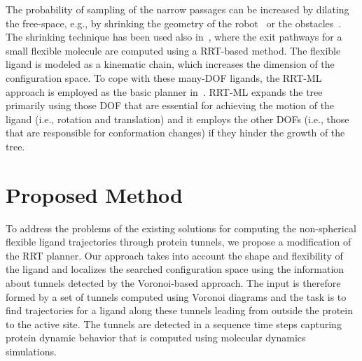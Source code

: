 \documentclass[usletter, 10pt, conference]{ieeeconf} %
\begin{document}
The probability of sampling of the narrow passages can be increased by dilating the free-space, e.g., by shrinking the geometry of 
the robot~\cite{hsuOnProb} or the obstacles~\cite{bayazitIRC}.
The shrinking technique has been used also in~\cite{cortes2010simulating}, where the exit pathways for a small flexible molecule are
computed using a RRT-based method.
The flexible ligand is modeled as a kinematic chain, which increases the dimension of the configuration space.
To cope with these many-DOF ligands, the RRT-ML~\cite{cortes2007mlrrt} approach is employed as the basic planner in~\cite{cortes2010simulating}.
RRT-ML expands the tree primarily using those DOF that are essential for achieving the motion of the ligand (i.e., rotation
and translation) and it employs the other DOFs (i.e., those that are responsible for conformation changes) if they hinder the growth of the tree.




\section{Proposed Method}
To address the problems of the existing solutions for computing the non-spherical flexible ligand trajectories through protein tunnels, we propose a modification of the RRT planner. 
Our approach takes into account the shape and flexibility of the ligand and localizes the searched configuration space using the information about tunnels detected by the Voronoi-based approach.
The input is therefore formed by a set of tunnels computed using Voronoi diagrams and the task is to find trajectories for a ligand along these tunnels
leading from outside the protein to the active site.
The tunnels are detected in a sequence time steps capturing protein dynamic behavior that is computed using molecular dynamics simulations. 
\end{document}

